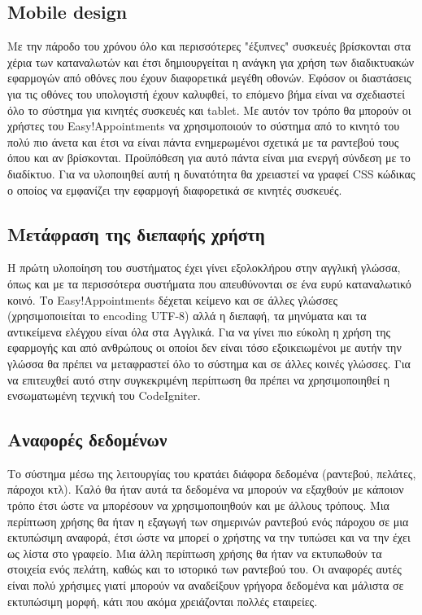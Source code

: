 \subsection{Mobile design}
Με την πάροδο του χρόνου όλο και περισσότερες "έξυπνες" συσκευές βρίσκονται στα χέρια των καταναλωτών και έτσι δημιουργείται η ανάγκη για χρήση των διαδικτυακών εφαρμογών από οθόνες που έχουν διαφορετικά μεγέθη οθονών. Εφόσον οι διαστάσεις για τις οθόνες του υπολογιστή έχουν καλυφθεί, το επόμενο βήμα είναι να σχεδιαστεί όλο το σύστημα για κινητές συσκευές και tablet. Με αυτόν τον τρόπο θα μπορούν οι χρήστες του Easy!Appointments να χρησιμοποιούν το σύστημα από το κινητό του πολύ πιο άνετα και έτσι να είναι πάντα ενημερωμένοι σχετικά με τα ραντεβού τους όπου και αν βρίσκονται. Προϋπόθεση για αυτό πάντα είναι μια ενεργή σύνδεση με το διαδίκτυο. Για να υλοποιηθεί αυτή η δυνατότητα θα χρειαστεί να γραφεί CSS κώδικας ο οποίος να εμφανίζει την εφαρμογή διαφορετικά σε κινητές συσκευές.

\subsection{Μετάφραση της διεπαφής χρήστη}
Η πρώτη υλοποίηση του συστήματος έχει γίνει εξολοκλήρου στην αγγλική γλώσσα, όπως και με τα περισσότερα συστήματα που απευθύνονται σε ένα ευρύ καταναλωτικό κοινό. Το Easy!Appointments δέχεται κείμενο και σε άλλες γλώσσες (χρησιμοποιείται το encoding UTF-8) αλλά η διεπαφή, τα μηνύματα και τα αντικείμενα ελέγχου είναι όλα στα Αγγλικά. Για να γίνει πιο εύκολη η χρήση της εφαρμογής και από ανθρώπους οι οποίοι δεν είναι τόσο εξοικειωμένοι με αυτήν την γλώσσα θα πρέπει να μεταφραστεί όλο το σύστημα και σε άλλες κοινές γλώσσες. Για να επιτευχθεί αυτό στην συγκεκριμένη περίπτωση θα πρέπει να χρησιμοποιηθεί η ενσωματωμένη τεχνική του CodeIgniter.

\subsection{Αναφορές δεδομένων}
Το σύστημα μέσω της λειτουργίας του κρατάει διάφορα δεδομένα (ραντεβού, πελάτες, πάροχοι κτλ). Καλό θα ήταν αυτά τα δεδομένα να μπορούν να εξαχθούν με κάποιον τρόπο έτσι ώστε να μπορέσουν να χρησιμοποιηθούν και με άλλους τρόπους. Μια περίπτωση χρήσης θα ήταν η εξαγωγή των σημερινών ραντεβού ενός πάροχου σε μια εκτυπώσιμη αναφορά, έτσι ώστε να μπορεί ο χρήστης να την τυπώσει και να την έχει ως λίστα στο γραφείο. Μια άλλη περίπτωση χρήσης θα ήταν να εκτυπωθούν τα στοιχεία ενός πελάτη, καθώς και το ιστορικό των ραντεβού του. Οι αναφορές αυτές είναι πολύ χρήσιμες γιατί μπορούν να αναδείξουν γρήγορα δεδομένα και μάλιστα σε εκτυπώσιμη μορφή, κάτι που ακόμα χρειάζονται πολλές εταιρείες.

